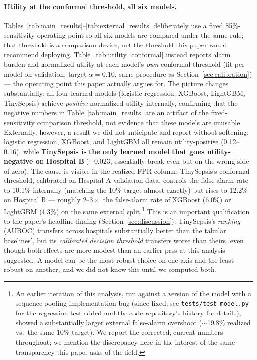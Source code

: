 \documentclass[11pt]{article}
\begin{document}
\paragraph{Utility at the conformal threshold, all six models.} Tables~\ref{tab:main_results}--\ref{tab:external_results} deliberately use a fixed 85\%-sensitivity operating point so all six models are compared under the same rule; that threshold is a comparison device, not the threshold this paper would recommend deploying. Table~\ref{tab:utility_conformal} instead reports alarm burden and normalized utility at each model's \emph{own} conformal threshold (fit per-model on validation, target $\alpha=0.10$, same procedure as Section~\ref{sec:calibration}) --- the operating point this paper actually argues for. The picture changes substantially: all four learned models (logistic regression, XGBoost, LightGBM, TinySepsis) achieve \emph{positive} normalized utility internally, confirming that the negative numbers in Table~\ref{tab:main_results} are an artifact of the fixed-sensitivity comparison threshold, not evidence that these models are unusable. Externally, however, a result we did not anticipate and report without softening: logistic regression, XGBoost, and LightGBM all remain utility-positive (0.12--0.16), while \textbf{TinySepsis is the only learned model that goes utility-negative on Hospital B} ($-0.023$, essentially break-even but on the wrong side of zero). The cause is visible in the realized-FPR column: TinySepsis's conformal threshold, calibrated on Hospital-A validation data, controls the false-alarm rate to 10.1\% internally (matching the 10\% target almost exactly) but rises to 12.2\% on Hospital B --- roughly $2$--$3\times$ the false-alarm rate of XGBoost (6.0\%) or LightGBM (4.3\%) on the same external split.\footnote{An earlier iteration of this analysis, run against a version of the model with a sequence-pooling implementation bug (since fixed; see \texttt{tests/test\_model.py} for the regression test added and the code repository's history for details), showed a substantially larger external false-alarm overshoot ($\sim$19.8\% realized vs.\ the same 10\% target). We report the corrected, current numbers throughout; we mention the discrepancy here in the interest of the same transparency this paper asks of the field.} This is an important qualification to the paper's headline finding (Section~\ref{sec:discussion}): TinySepsis's \emph{ranking} (AUROC) transfers across hospitals substantially better than the tabular baselines', but its \emph{calibrated decision threshold} transfers worse than theirs, even though both effects are more modest than an earlier pass at this analysis suggested. A model can be the most robust choice on one axis and the least robust on another, and we did not know this until we computed both.
\end{document}
